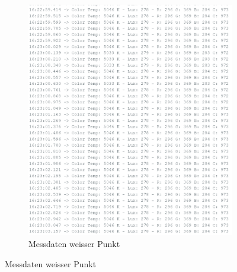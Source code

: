 \documentclass[../main.tex]{subfiles}
\begin{document}
\begin{figure}[H]
\begin{subfigure}{0.35\textwidth}
        \includegraphics[width=\linewidth]{img/sensortest/MD_WeisserPunkt_101ms.png}
        \caption{Messdaten weisser Punkt}
        \label{fig:MDFarbsensorWeisserPunkt}
    \end{subfigure}
    
    \vspace{0.5cm}


\end{figure}
\end{document}
